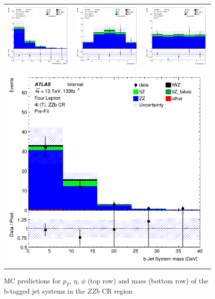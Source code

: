 \clearpage
\begin{figure}[htbp]
\centering
  \begin{tabular}{ccc}

    \includegraphics[width=.2\textwidth]{figures/PreFitPlots/lep4_ZZb_4T_bJet_sys_Pt}&
    \includegraphics[width=.2\textwidth]{figures/PreFitPlots/lep4_ZZb_4T_bJet_sys_Eta} &
    \includegraphics[width=.2\textwidth]{figures/PreFitPlots/lep4_ZZb_4T_bJet_sys_Phi} \\
    \multicolumn{3}{c}{\includegraphics[width=.2\textwidth]{figures/PreFitPlots/lep4_ZZb_4T_bJet_sys_mass}}

  \end{tabular}
  \caption{MC predictions for $p_{T}$, $\eta$, $\phi$ (top row) and mass (bottom row) of the b-tagged jet systems in the $ZZb$ CR region }
  \label{fig:4lep-ZZb-CR-bjet-sys-Plots}
\end{figure}


